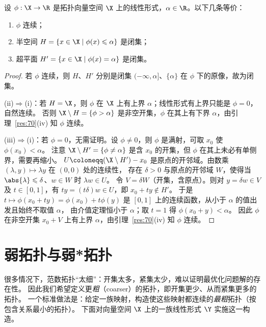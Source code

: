 \begin{lemma}[闭半空间]
\label{res:71}
设 $\phi:\X\to\R$ 是拓扑向量空间 $\X$ 上的线性形式，$\alpha\in\R$。以下几条等价：
\begin{enumerate}[label=(\roman*)]
  \item $\phi$ 连续；
  \item 半空间 $H=\{x\in\X\mid\phi(x)\leqslant\alpha\}$ 是闭集；
  \item 超平面 $H'=\{x\in\X\mid\phi(x)=\alpha\}$ 是闭集。
\end{enumerate}
\end{lemma}

\begin{proof}
若 $\phi$ 连续，则 $H$、$H'$ 分别是闭集 $(-\infty,\alpha]$、$\{\alpha\}$ 在 $\phi$ 下的原像，故为闭集。

(ii)$\Rightarrow$(i)：若 $H=\X$，则 $\phi$ 在 $\X$ 上有上界 $\alpha$；线性形式有上界只能是 $\phi=0$，自然连续。
否则 $\X\setminus H=\{\phi>\alpha\}$ 是非空开集，$\phi$ 在其上有下界 $\alpha$，由引理~\ref{res:70}(iv) 知 $\phi$ 连续。

(iii)$\Rightarrow$(i)：若 $\phi=0$，无需证明。设 $\phi\neq0$，则 $\phi$ 是满射，可取 $x_0$ 使 $\phi(x_0)<\alpha$。
注意 $\X\setminus H'=\{\phi\neq\alpha\}$ 是含 $x_0$ 的开集，但 $\phi$ 在其上未必有单侧界，需要再缩小。
$U\coloneqq(\X\setminus H')-x_0$ 是原点的开邻域。由数乘 $(\lambda,y)\mapsto\lambda y$ 在 $(0,0)$ 处的连续性，
存在 $\delta>0$ 与原点的开邻域 $W$，使得当 $\abs{\lambda}\leqslant\delta$、$w\in W$ 时 $\lambda w\in U$。
令 $V=\delta W$（开集，含原点）。则对 $y=\delta w\in V$ 及 $t\in[0,1]$，有 $ty=(t\delta)w\in U$，即 $x_0+ty\notin H'$。
于是 $t\mapsto\phi(x_0+ty)=\phi(x_0)+t\phi(y)$ 是 $[0,1]$ 上的连续函数，从小于 $\alpha$ 的值出发且始终不取值 $\alpha$，
由介值定理恒小于 $\alpha$；取 $t=1$ 得 $\phi(x_0+y)<\alpha$。
因此 $\phi$ 在非空开集 $x_0+V$ 上有上界 $\alpha$，由引理~\ref{res:70}(iv) 知 $\phi$ 连续。
\end{proof}

\section{弱拓扑与弱*拓扑}

很多情况下，范数拓扑“太细”：开集太多，紧集太少，难以证明最优化问题解的存在性。
因此我们希望定义更\emph{粗}（coarser）的拓扑，即开集更少、从而紧集更多的拓扑。
一个标准做法是：给定一族映射，构造使这些映射都连续的\emph{最粗}拓扑（按包含关系最小的拓扑）。
下面对向量空间 $\X$ 上的一族线性形式 $\Y$ 实施这一构造。

